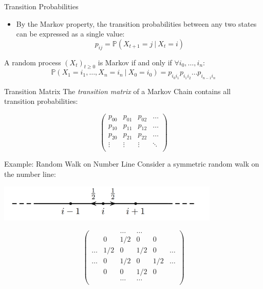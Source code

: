 \documentclass[aspectratio=169, handout]{beamer}
\newcommand{\pp}[0]{\mathbb{P}}
\begin{document}
\begin{frame}{Transition Probabilities}
  \begin{itemize}
      \item By the Markov property, the transition probabilities between any two states can be expressed as a single value:
      \[p_{ij} = \pp(X_{t+1} = j ~ | ~ X_t = i) \]
  \end{itemize}\pause
  \begin{thrm}
      A random process $(X_t)_{t\geq0}$ is Markov if and only if $\forall i_0,\dots,i_n$:
      \[\pp(X_1 = i_1,\dots,X_n = i_n ~|~X_0 = i_0) = p_{i_0i_1}p_{i_1i_2}\dots p_{i_{n-1}i_n} \]
  \end{thrm}
\end{frame}

\begin{frame}{Transition Matrix}
    The \textit{transition matrix} of a Markov Chain contains all transition probabilities:

    \[\begin{pmatrix}
        p_{00} & p_{01} & p_{02} & \dots\\
        p_{10} & p_{11} & p_{12} & \dots\\
        p_{20} & p_{21} & p_{22} & \dots\\
        \vdots & \vdots & \vdots & \ddots\\
    \end{pmatrix}\]
\end{frame}

\begin{frame}{Example: Random Walk on Number Line}
    Consider a symmetric random walk on the number line:
    \begin{center}
        \includegraphics[width=300pt]{ssrw1d.png}
    \end{center}
    \pause
    \[\begin{pmatrix}
            & & \dots & \dots & \\
          & 0 & 1/2 & 0 & 0 & \\
        \dots & 1/2 & 0 & 1/2 & 0 & \dots\\
         \dots & 0 & 1/2 & 0 & 1/2 & \dots\\
         & 0 & 0 & 1/2 & 0 & \\
         & & \dots & \dots  &\\
    \end{pmatrix}\]
\end{frame}
\end{document}

